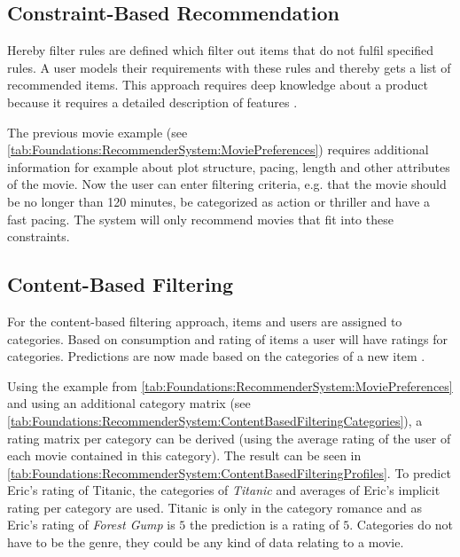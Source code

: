 \subsection{Constraint-Based Recommendation}
Hereby filter rules are defined which filter out items that do not fulfil specified rules. A user models their requirements with these rules and thereby gets a list of recommended items. This approach requires deep knowledge about a product because it requires a detailed description of features  \cite[~ p. 12]{felfernigDecisionTasksBasic2018}.

The previous movie example (see \autoref{tab:Foundations:RecommenderSystem:MoviePreferences}) requires additional information for example about plot structure, pacing, length and other attributes of the movie. Now the user can enter filtering criteria, e.g. that the movie should be no longer than 120 minutes, be categorized as action or thriller and have a fast pacing. The system will only recommend movies that fit into these constraints.

\subsection{Content-Based Filtering}
For the content-based filtering approach, items and users are assigned to categories. Based on consumption and rating of items a user will have ratings for categories. Predictions are now made based on the categories of a new item \cite[~ pp. 10, 11]{felfernigDecisionTasksBasic2018}.

Using the example from \autoref{tab:Foundations:RecommenderSystem:MoviePreferences} and using an additional category matrix (see \autoref{tab:Foundations:RecommenderSystem:ContentBasedFilteringCategories}), a rating matrix per category can be derived (using the average rating of the user of each movie contained in this category). The result can be seen in \autoref{tab:Foundations:RecommenderSystem:ContentBasedFilteringProfiles}. To predict Eric's rating of Titanic, the categories of \textit{Titanic} and averages of Eric's implicit rating per category are used. Titanic is only in the category romance and as Eric's rating of \textit{Forest Gump} is $5$ the prediction is a rating of $5$. Categories do not have to be the genre, they could be any kind of data relating to a movie.

